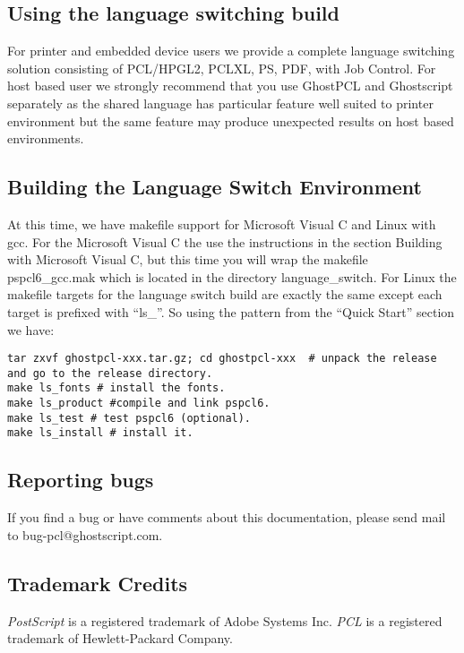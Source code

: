 \documentclass[10pt]{article}
\begin{document}
\subsection*{Using the language switching build}

For printer and embedded device users we provide a complete language
switching solution consisting of PCL/HPGL2, PCLXL, PS, PDF, with Job
Control.  For host based user we strongly recommend that you use
GhostPCL and Ghostscript separately as the shared language has
particular feature well suited to printer environment but the same
feature may produce unexpected results on host based environments.

\subsection*{Building the Language Switch Environment}

At this time, we have makefile support for Microsoft Visual C and
Linux with gcc.  For the Microsoft Visual C the use the instructions
in the section Building with Microsoft Visual C, but this time you
will wrap the makefile pspcl6\_gcc.mak which is located in the
directory language\_switch.  For Linux the makefile targets for the
language switch build are exactly the same except each target is
prefixed with ``ls\_''.  So using the pattern from the ``Quick Start''
section we have:

\begin{verbatim}
tar zxvf ghostpcl-xxx.tar.gz; cd ghostpcl-xxx  # unpack the release and go to the release directory.
make ls_fonts # install the fonts.
make ls_product #compile and link pspcl6.
make ls_test # test pspcl6 (optional).
make ls_install # install it.
\end{verbatim}

\subsection*{Reporting bugs}

If you find a bug or have comments about this documentation, please
send mail to bug-pcl@ghostscript.com.

\subsection*{Trademark Credits}

\emph{PostScript} is a registered trademark of Adobe Systems Inc.
\emph{PCL} is a registered trademark of Hewlett-Packard Company.
\end{document}
